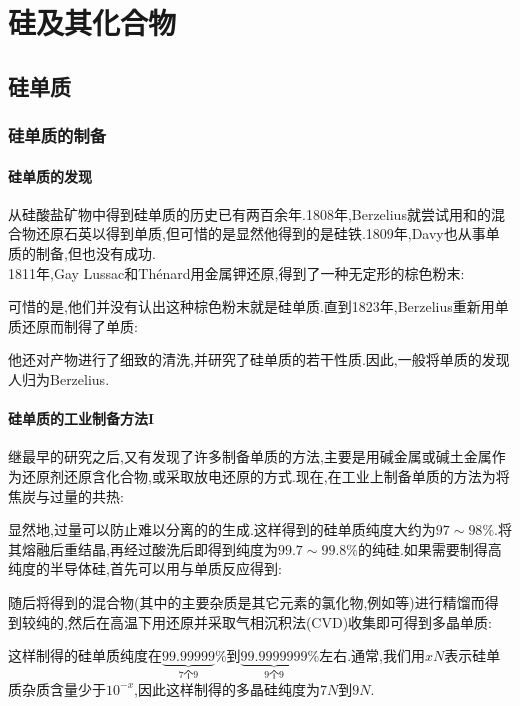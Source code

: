 \documentclass{ctexart}
\begin{document}
\section{硅及其化合物}
\subsection{硅单质}
\subsubsection{硅单质的制备}
\paragraph{硅单质的发现}
从硅酸盐矿物中得到硅单质的历史已有两百余年.1808年,Berzelius就尝试用和的混合物还原石英以得到单质,但可惜的是显然他得到的是硅铁.1809年,Davy也从事单质的制备,但也没有成功.\\
\indent 1811年,Gay Lussac和Thénard用金属钾还原,得到了一种无定形的棕色粉末:
\begin{center}
\end{center}
可惜的是,他们并没有认出这种棕色粉末就是硅单质.直到1823年,Berzelius重新用单质还原而制得了单质:
\begin{center}
\end{center}
他还对产物进行了细致的清洗,并研究了硅单质的若干性质.因此,一般将单质的发现人归为Berzelius.
\paragraph{硅单质的工业制备方法I}
\indent 继最早的研究之后,又有发现了许多制备单质的方法,主要是用碱金属或碱土金属作为还原剂还原含化合物,或采取放电还原的方式.现在,在工业上制备单质的方法为将焦炭与过量的共热:
\begin{center}
\end{center}
显然地,过量可以防止难以分离的的生成.这样得到的硅单质纯度大约为$97\sim98\%$.将其熔融后重结晶,再经过酸洗后即得到纯度为$99.7\sim99.8\%$的纯硅.如果需要制得高纯度的半导体硅,首先可以用与单质反应得到:
\begin{center}
\end{center}
随后将得到的混合物(其中的主要杂质是其它元素的氯化物,例如等)进行精馏而得到较纯的,然后在高温下用还原并采取气相沉积法(CVD)收集即可得到多晶单质:
\begin{center}
\end{center}
这样制得的硅单质纯度在$\underbrace{99.99999}_{\text{7个9}}\%$到$\underbrace{99.9999999}_{\text{9个9}}\%$左右.通常,我们用$xN$表示硅单质杂质含量少于$10^{-x}$,因此这样制得的多晶硅纯度为$7N$到$9N$.
\end{document}
